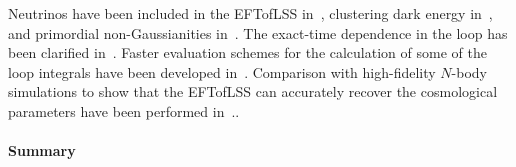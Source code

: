 \documentclass[12pt,a4paper]{article}
\renewcommand{\(}{\left(}
\renewcommand{\)}{\right)}
\begin{document}
{Neutrinos have been included in the EFTofLSS in~\cite{Senatore:2017hyk,deBelsunce:2018xtd}, clustering dark energy in~\cite{Lewandowski:2016yce,Lewandowski:2017kes,Cusin:2017wjg,Bose:2018orj}, and primordial non-Gaussianities in~\cite{Angulo:2015eqa, Assassi:2015jqa, Assassi:2015fma, Bertolini:2015fya, Lewandowski:2015ziq, Bertolini:2016hxg}. 
The exact-time dependence in the loop has been clarified in~\cite{Donath:2020abv,Fujita:2020xtd}. 
Faster evaluation schemes for the calculation of some of the loop integrals have been developed in~\cite{Simonovic:2017mhp}.
Comparison with high-fidelity $N$-body simulations to show that the EFTofLSS can accurately recover the cosmological parameters have been performed in~\cite{DAmico:2019fhj,Colas:2019ret,Nishimichi:2020tvu}.}. 

\paragraph{Summary} 
\end{document}
